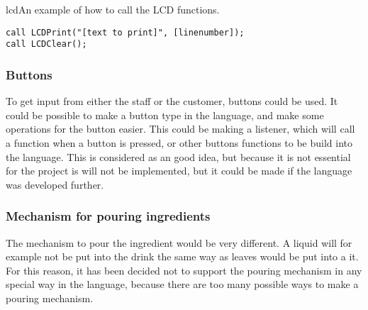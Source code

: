 \begin{code}{lcd}{An example of how to call the LCD functions.}
\begin{lstlisting}[mathescape]
call LCDPrint("[text to print]", [linenumber]);
call LCDClear();
\end{lstlisting}
\end{code}

\subsubsection{Buttons}
To get input from either the staff or the customer, buttons could be used. It could be possible to make a button type in the language, and make some operations for the button easier. This could be making a listener, which will call a function when a button is pressed, or other buttons functions to be build into the language. This is considered as an good idea, but because it is not essential for the project is will not be implemented, but it could be made if the language was developed further.

\subsubsection{Mechanism for pouring ingredients}
The mechanism to pour the ingredient would be very different. A liquid will for example not be put into the drink the same way as leaves would be put into a it. For this reason, it has been decided not to support the pouring mechanism in any special way in the language, because there are too many possible ways to make a pouring mechanism.
